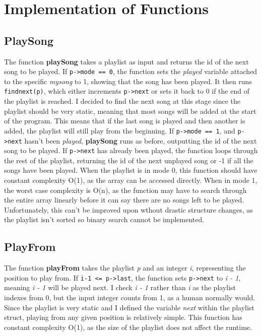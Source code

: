 \documentclass[11pt]{article}
\begin{document}
\section{Implementation of Functions}
\label{sec:org9179c6b}

\subsection{PlaySong}
\label{sec:org6bbe317}

The function \textbf{playSong} takes a playlist as input and returns the id of the next song to be played.
If \texttt{p->mode == 0}, the function sets the \emph{played} variable attached to the specific \emph{mysong} to 1, showing that the song has been played. 
It then runs \texttt{findnext(p)}, which either increments \texttt{p->next} or sets it back to 0 if the end of the playlist is reached.
I decided to find the next song at this stage since the playlist should be very static, meaning that most songs will be added at the start of the program.
This means that if the last song is played and then another is added, the playlist will still play from the beginning.
If \texttt{p->mode == 1}, and \texttt{p->next} hasn't been \emph{played}, \textbf{playSong} runs as before, outputting the id of the next song to be played.
If \texttt{p->next} has already been played, the function loops through the rest of the playlist, returning the id of the next unplayed song or -1 if all the songs have been played.
When the playlist is in mode 0, this function should have constant complexity O(1), as the array can be accessed directly.
When in mode 1, the worst case complexity is O(n), as the function may have to search through the entire array linearly before it can say there are no songs left to be played.
Unfortunately, this can't be improved upon wthout drastic structure changes, as the playlist isn't sorted so binary search cannot be implemented.

\subsection{PlayFrom}
\label{sec:orgc2230d7}

The function \textbf{playFrom} takes the playlist \emph{p} and an integer \emph{i}, representing the position to play from.
If \texttt{i-1 <= p->last}, the function sets \texttt{p->next} to \emph{i - 1}, meaning \emph{i - 1} will be played next.
I check \emph{i - 1} rather than \emph{i} as the playlist indexes from 0, but the input integer counts from 1, as a human normally would.
Since the playlist is very static and I defined the variable \emph{next} within the playlist struct, playing from any given position is relatively simple.
This function has constant complexity O(1), as the size of the playlist does not affect the runtime.
\end{document}
